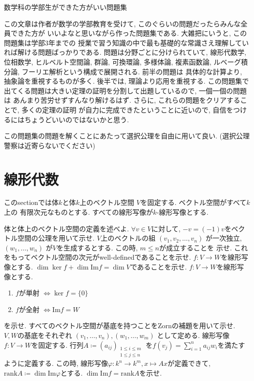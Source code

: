 \documentclass[lualatex]{exam}
\theoremstyle{remark}
\theoremstyle{plain}
\newcommand{\jtoday}{\number \year 年 \number \month 月 \number \day 日}
\begin{document}
\centerline{\Large 数学科の学部生ができた方がいい問題集 }
\rightline{\jtoday}
\tableofcontents
この文章は作者が数学の学部教育を受けて, このぐらいの問題だったらみんな全員できた方が
いいよなと思いながら作った問題集である. 大雑把にいうと, この問題集は学部3年までの
授業で習う知識の中で最も基礎的な常識さえ理解していれば解ける問題ばっかりである.
問題は分野ごとに分けられていて, 線形代数学, 位相数学, ヒルベルト空間論, 群論, 可換環論, 多様体論, 
複素函数論, ルベーグ積分論, フーリエ解析という構成で展開される. 前半の問題は
具体的な計算より, 抽象論を重視するものが多く. 後半では, 理論より応用を重視する. 
この問題集で出てくる問題は大きい定理の証明を分割して出題しているので, 一個一個の問題は
あんまり苦労せずすんなり解けるはず. さらに, これらの問題をクリアすることで, 多くの定理の証明
が自力に完成できたということに近いので, 自信をつけるにはちょうどいいのではないかと思う. 

この問題集の問題を解くことにあたって選択公理を自由に用いて良い. (選択公理警察は近寄らないでください)
\section{線形代数}
このsectionでは体$k$と体$k$上のベクトル空間 $V$を固定する. ベクトル空間がすべて$k$上の
有限次元なものとする. すべての線形写像が$k$-線形写像とする. 
\begin{questions}
  \question 体と体上のベクトル空間の定義を述べよ. 
  \question $\forall v \in V$に対して, $-v = (-1)v$をベクトル空間の公理を用いて示せ.
  \question $V$上のベクトルの組 $\left( v_1, v_2, \ldots, v_n \right) $ が一次独立, 
  $\left( w_1, \ldots ,w_n \right) $ が$V$を生成するとする. この時,  $m \leq n$が成立することを
  示せ. これをもってベクトル空間の次元がwell-definedであることを示せ.
  \question $f:V \to W$を線形写像とする. $\dim \ker f + \dim \mathrm{Im} f= \dim V$であることを示せ. 
  \question $f:V\to W$を線形写像とする. 
   \begin{enumerate}
    \item $f$が単射 $\iff \ker f = \{0\} $ 
    \item $f$が全射 $\iff \mathrm{Im}f =W$
  \end{enumerate}
  を示せ. 
  \question すべてのベクトル空間が基底を持つことをZornの補題を用いて示せ.
  \question $V,W$の基底をそれぞれ $\left( v_1,\ldots,v_n \right), \left( w_1, \ldots ,w_m \right)  $ として定める. 
  線形写像$f:V \to W$を固定する. 行列$A \coloneqq \left( a_{ij} \right)_{\substack{1\leq i \leq m \\  1 \leq j \leq n}} $ を$f(v_j) = \sum_{i=1}^{n} a_{ij} w_i$を満たすように定義する. 
  この時, 線形写像$\varphi : k^n \to k^m, x \mapsto Ax $が定義できて, $\mathrm{rank} A \coloneqq \dim \mathrm{Im}\varphi  $とする. 
  $\dim \mathrm{Im}f = \mathrm{rank}A$を示せ.
\end{questions}
\end{document}
